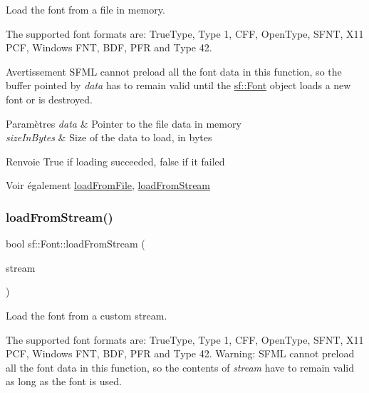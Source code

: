 Load the font from a file in memory. 

The supported font formats are\+: True\+Type, Type 1, C\+FF, Open\+Type, S\+F\+NT, X11 P\+CF, Windows F\+NT, B\+DF, P\+FR and Type 42.

\begin{DoxyWarning}{Avertissement}
S\+F\+ML cannot preload all the font data in this function, so the buffer pointed by {\itshape data} has to remain valid until the \hyperlink{classsf_1_1Font}{sf\+::\+Font} object loads a new font or is destroyed.
\end{DoxyWarning}

\begin{DoxyParams}{Paramètres}
{\em data} & Pointer to the file data in memory \\
\hline
{\em size\+In\+Bytes} & Size of the data to load, in bytes\\
\hline
\end{DoxyParams}
\begin{DoxyReturn}{Renvoie}
True if loading succeeded, false if it failed
\end{DoxyReturn}
\begin{DoxySeeAlso}{Voir également}
\hyperlink{classsf_1_1Font_ab020052ef4e01f6c749a85571c0f3fd1}{load\+From\+File}, \hyperlink{classsf_1_1Font_abc3f37a354ce8b9a21f8eb93bd9fdafb}{load\+From\+Stream} 
\end{DoxySeeAlso}
\mbox{\label{classsf_1_1Font_abc3f37a354ce8b9a21f8eb93bd9fdafb}} 
\subsubsection{\texorpdfstring{load\+From\+Stream()}{loadFromStream()}}
{\footnotesize\ttfamily bool sf\+::\+Font\+::load\+From\+Stream (\begin{DoxyParamCaption}\item[{\hyperlink{classsf_1_1InputStream}{Input\+Stream} \&}]{stream }\end{DoxyParamCaption})}



Load the font from a custom stream. 

The supported font formats are\+: True\+Type, Type 1, C\+FF, Open\+Type, S\+F\+NT, X11 P\+CF, Windows F\+NT, B\+DF, P\+FR and Type 42. Warning\+: S\+F\+ML cannot preload all the font data in this function, so the contents of {\itshape stream} have to remain valid as long as the font is used.

